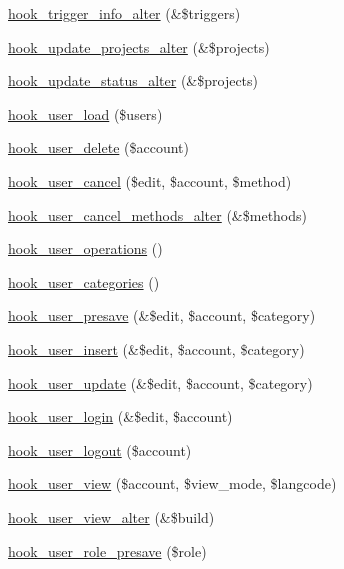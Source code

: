 \begin{DoxyCompactItemize}
\item 
\hyperlink{group__hooks_gae39072ea60b8856675663f51d5355d57}{hook\_\-trigger\_\-info\_\-alter} (\&\$triggers)
\item 
\hyperlink{group__hooks_gaed261bce503f9437df042668cc070bf7}{hook\_\-update\_\-projects\_\-alter} (\&\$projects)
\item 
\hyperlink{group__hooks_ga62b22dcd7e2e14b061cedd46a7862352}{hook\_\-update\_\-status\_\-alter} (\&\$projects)
\item 
\hyperlink{group__hooks_ga81027843e38de3a899fa6e72f876d6b6}{hook\_\-user\_\-load} (\$users)
\item 
\hyperlink{group__hooks_ga2c0755857e486e8a770b44b496da9929}{hook\_\-user\_\-delete} (\$account)
\item 
\hyperlink{group__hooks_gad6223ddd2f0f52c331df8a3315d9a41e}{hook\_\-user\_\-cancel} (\$edit, \$account, \$method)
\item 
\hyperlink{group__hooks_gadbac37235bb01361bf8b3d375ea417a5}{hook\_\-user\_\-cancel\_\-methods\_\-alter} (\&\$methods)
\item 
\hyperlink{group__hooks_ga1b2c2630f79b64b0673d0a9a0983f447}{hook\_\-user\_\-operations} ()
\item 
\hyperlink{group__hooks_ga166a3fe9d203a99560d10413a880ed08}{hook\_\-user\_\-categories} ()
\item 
\hyperlink{group__hooks_gab6b224c35d7d97259d4350a7849f1e56}{hook\_\-user\_\-presave} (\&\$edit, \$account, \$category)
\item 
\hyperlink{group__hooks_gaa3e2c4c972ee796d216b15da7aaf9c2c}{hook\_\-user\_\-insert} (\&\$edit, \$account, \$category)
\item 
\hyperlink{group__hooks_gab71262402336071ef7c3d08f4c36e887}{hook\_\-user\_\-update} (\&\$edit, \$account, \$category)
\item 
\hyperlink{group__hooks_ga8cce712a39ee6e57bd506b5a0c457d09}{hook\_\-user\_\-login} (\&\$edit, \$account)
\item 
\hyperlink{group__hooks_ga49a4bb63d4b643cf9e3feb2266fe4865}{hook\_\-user\_\-logout} (\$account)
\item 
\hyperlink{group__hooks_gaafb9e35d1f82a33918437ad7acf29541}{hook\_\-user\_\-view} (\$account, \$view\_\-mode, \$langcode)
\item 
\hyperlink{group__hooks_ga31a81ec1419afc31ebb77a9a86afe754}{hook\_\-user\_\-view\_\-alter} (\&\$build)
\item 
\hyperlink{group__hooks_ga0b603e56348f9a8ab31505cc7e7acd36}{hook\_\-user\_\-role\_\-presave} (\$role)

\end{DoxyCompactItemize}
